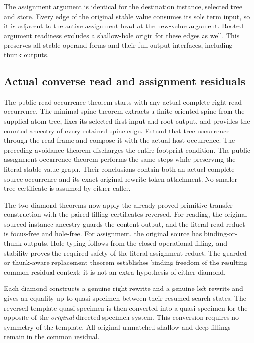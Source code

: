 The assignment argument is identical for the destination instance, selected
tree and store. Every edge of the original stable value consumes its sole term
input, so it is adjacent to the active assignment head at the new-value
argument. Rooted argument readiness excludes a shallow-hole origin for these
edges as well. This preserves all stable operand forms and their full output
interfaces, including thunk outputs.

\subsection{Actual converse read and assignment residuals}
The public read-occurrence theorem starts with any actual complete right read
occurrence. The minimal-spine theorem extracts a finite oriented spine from
the supplied atom tree, fixes its selected first input and root output, and
provides the counted ancestry of every retained spine edge. Extend that tree
occurrence through the read frame and compose it with the actual host
occurrence. The preceding avoidance theorem discharges the entire footprint
condition. The public assignment-occurrence theorem performs the same steps
while preserving the literal stable value graph. Their conclusions contain
both an actual complete source occurrence and its exact original rewrite-token
attachment. No smaller-tree certificate is assumed by either caller.

The two diamond theorems now apply the already proved primitive transfer
construction with the paired filling certificates reversed. For reading,
the original sourced-instance ancestry guards the content output, and the
literal read reduct is focus-free and hole-free. For assignment, the original
source has binding-or-thunk outputs. Hole typing follows from the closed
operational filling, and stability proves the required safety of the literal
assignment reduct. The guarded or thunk-aware replacement theorem establishes
binding freedom of the resulting common residual context; it is not an extra
hypothesis of either diamond.

Each diamond constructs a genuine right rewrite and a genuine left rewrite
and gives an equality-up-to quasi-specimen between their resumed search
states. The reversed-template quasi-specimen is then converted into a
quasi-specimen for the opposite of the \emph{original} directed specimen
system. This conversion requires no symmetry of the template. All original
unmatched shallow and deep fillings remain in the common residual.

